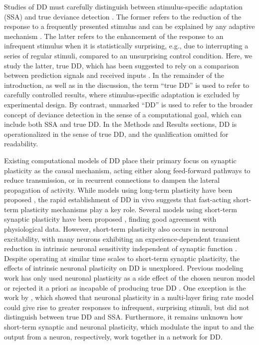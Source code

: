 \documentclass[9pt,lineno,onehalfspacing]{elife}
\begin{document}
Studies of DD must carefully distinguish between stimulus-specific adaptation (SSA) and true deviance detection \citep{Ross2020-qf}. The former refers to the reduction of the response to a frequently presented stimulus and can be explained by any adaptive mechanism \citep{May2010-qn, Garagnani2011-eu}. The latter refers to the enhancement of the response to an infrequent stimulus when it is statistically surprising, e.g., due to interrupting a series of regular stimuli, compared to an unsurprising control condition. Here, we study the latter, true DD, which has been suggested to rely on a comparison between prediction signals and received inputs \citep{Parras2017-fp, Carbajal2018-sd, Ross2020-qf}. In the remainder of the introduction, as well as in the discussion, the term ``true DD'' is used to refer to carefully controlled results, where stimulus-specific adaptation is excluded by experimental design. By contrast, unmarked ``DD'' is used to refer to the broader concept of deviance detection in the sense of a computational goal, which can include both SSA and true DD. In the Methods and Results sections, DD is operationalized in the sense of true DD, and the qualification omitted for readability.

Existing computational models of DD place their primary focus on synaptic plasticity as the causal mechanism, acting either along feed-forward pathways to reduce transmission, or in recurrent connections to dampen the lateral propagation of activity. While models using long-term plasticity have been proposed \citep{Wacongne2012-ah, Hertag2020-kc}, the rapid establishment of DD in vivo \citep{Taaseh2011-gg} suggests that fast-acting short-term plasticity mechanisms play a key role. Several models using short-term synaptic plasticity have been proposed \citep{Mill2011-ah, May2015-lt, Yarden2017-eh}, finding good agreement with physiological data. However, short-term plasticity also occurs in neuronal excitability, with many neurons exhibiting an experience-dependent transient reduction in intrinsic neuronal sensitivity independent of synaptic function \citep{Sanchez-Vives2000-df, Henze2001-xd, Sanchez-Aguilera2014-fd}. Despite operating at similar time scales to short-term synaptic plasticity, the effects of intrinsic neuronal plasticity on DD is unexplored.  Previous modeling work has only used neuronal plasticity as a side effect of the chosen neuron model \citep{Mill2011-ah} or rejected it a priori as incapable of producing true DD \citep{Yarden2017-eh}. One exception is the work by \cite{Garagnani2011-eu}, which showed that neuronal plasticity in a multi-layer firing rate model could give rise to greater responses to infrequent, surprising stimuli, but did not distinguish between true DD and SSA. Furthermore, it remains unknown how short-term synaptic and neuronal plasticity, which modulate the input to and the output from a neuron, respectively, work together in a network for DD.
\end{document}
